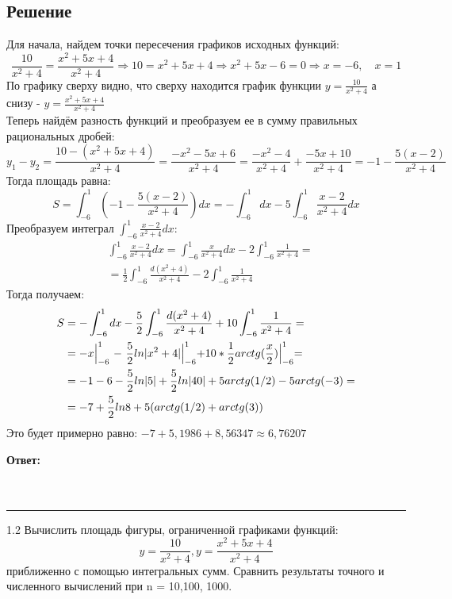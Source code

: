 \documentclass{article}
\begin{document}
\subsection*{Решение}
Для начала, найдем точки пересечения графиков исходных функций:
\[
\frac{10}{x^2 + 4} = \frac{x^2 + 5x + 4}{x^2 + 4}
\Rightarrow 10 = x^2 + 5x + 4
\Rightarrow x^2 + 5x - 6 = 0
\Rightarrow x = -6, \quad x = 1
\]
По графику сверху видно, что сверху находится график функции $y=\frac{10}{x^2+4}$ а снизу - $y=\frac{x^2+5x+4}{x^2+4}$ \\
Теперь найдём разность функций и преобразуем ее в сумму правильных рациональных дробей:
\[
y_1 - y_2 = \frac{10 - (x^2 + 5x + 4)}{x^2 + 4}  = \frac{-x^2 - 5x + 6}{x^2 + 4} = \frac{-x^2 - 4}{x^2 + 4} + \frac{-5x + 10}{x^2 + 4} = -1 - \frac{5(x - 2)}{x^2 + 4}
\]
Тогда площадь равна: 
\[
S = \int_{-6}^{1} \left(-1 - \frac{5(x - 2)}{x^2 + 4}\right) dx = -\int_{-6}^{1} dx - 5\int_{-6}^{1} \frac{x - 2}{x^2 + 4} dx
\]
Преобразуем интеграл $\int_{-6}^{1} \frac{x - 2}{x^2 + 4} dx$:
\begin{align*}
&\int_{-6}^{1} \frac{x - 2}{x^2 + 4} dx = \int_{-6}^{1} \frac{x}{x^2 + 4} dx - 2\int_{-6}^{1} \frac{1}{x^2+4} =\\
&= \frac{1}{2}\int_{-6}^{1} \frac{d(x^2+4)}{x^2+4}-2\int_{-6}^{1}\frac{1}{x^2+4}
\end{align*}
Тогда получаем:
\begin{align*}
S &= -\int_{-6}^{1}dx - \frac{5}{2}\int_{-6}^{1}\frac{d(x^2+4)}{x^2+4} + 10 \int_{-6}^{1}\frac{1}{x^2+4} =\\
&= -x \Bigl\lvert_{-6}^{1} \ - \ \frac{5}{2} ln|x^2+4|\Bigl\lvert_{-6}^{1} + 10 * \frac{1}{2}arctg(\frac{x}{2})\Bigl\lvert_{-6}^{1} =\\
&= -1 - 6 - \frac{5}{2}ln|5| + \frac{5}{2}ln|40| + 5 arctg(1/2) - 5arctg(-3) =\\
&= -7 + \frac{5}{2} ln8 + 5 (arctg(1/2) + arctg(3)) 
\end{align*}
Это будет примерно равно: $-7+5,1986 + 8,56347 \approx 6,76207$

\textbf{Ответ:}\\
\\
\\

\noindent\rule{\linewidth}{0.4pt}

1.2 Вычислить площадь фигуры, ограниченной графиками функций:
\[
y = \frac{10}{x^2+4}, y = \frac{x^2+5x+4}{x^2+4}
\]
приближенно с помощью интегральных сумм. Сравнить результаты точного и численного вычислений при n = 10,100, 1000.
\end{document}
